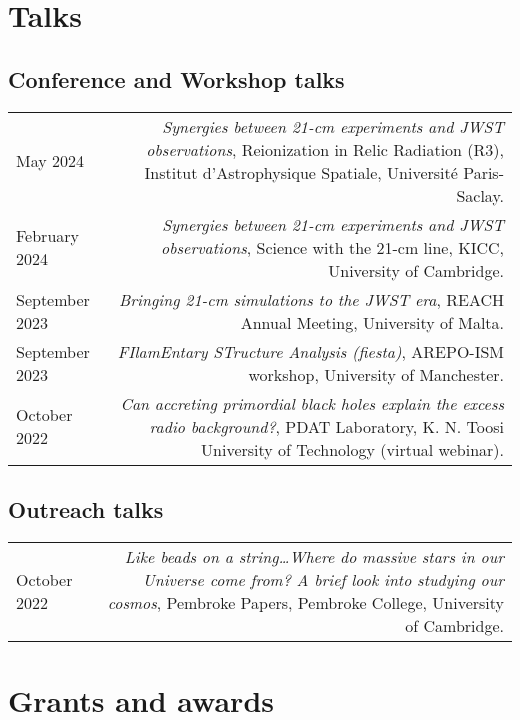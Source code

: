 \documentclass{article}
\begin{document}
\section*{Talks}
\subsection*{Conference and Workshop talks}
\begin{tabular}{L!{\vrule}R}

    May 2024 & \textit{Synergies between 21-cm experiments and JWST observations}, Reionization in Relic Radiation (R3), Institut d'Astrophysique Spatiale, Université Paris-Saclay. \\

    February 2024 & \textit{Synergies between 21-cm experiments and JWST observations}, Science with the 21-cm line, KICC, University of Cambridge. \\

    September 2023 & \textit{Bringing 21-cm simulations to the JWST era}, REACH Annual Meeting, University of Malta. \\

    September 2023 & \textit{FIlamEntary STructure Analysis (fiesta)}, AREPO-ISM workshop, University of Manchester. \\

    October 2022 & \textit{Can accreting primordial black holes explain the excess radio background?}, PDAT Laboratory, K. N. Toosi University of Technology (virtual webinar). \\

\end{tabular}

\subsection*{Outreach talks}
\begin{tabular}{L!{\vrule}R}

  October 2022 & \textit{Like beads on a string\ldots Where do massive stars in our Universe come from? A brief look into studying our cosmos}, Pembroke Papers, Pembroke College, University of Cambridge. \\

\end{tabular}

\section*{Grants and awards}
\end{document}
